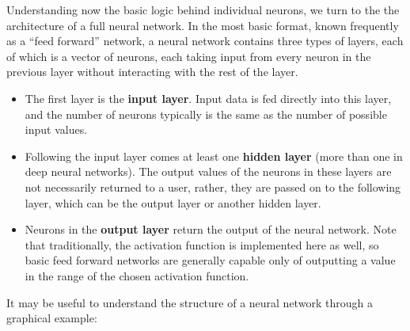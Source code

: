 \documentclass{article}
\begin{document}
Understanding now the basic logic behind individual neurons, we turn to the the architecture of a full neural network. In the most basic format, known frequently as a ``feed forward'' network, a neural network contains three types of layers, each of which is a vector of neurons, each taking input from every neuron in the previous layer without interacting with the rest of the layer.
\begin{itemize}
\item{The first layer is the \textbf{input layer}. Input data is fed directly into this layer, and the number of neurons typically is the same as the number of possible input values.}
\item{Following the input layer comes at least one \textbf{hidden layer} (more than one in deep neural networks). The output values of the neurons in these layers are not necessarily returned to a user, rather, they are passed on to the following layer, which can be the output layer or another hidden layer.}
\item{Neurons in the \textbf{output layer} return the output of the neural network. Note that traditionally, the activation function is implemented here as well, so basic feed forward networks are generally capable only of outputting a value in the range of the chosen activation function.}
\end{itemize}

It may be useful to understand the structure of a neural network through a graphical example:
\begin{center}
\end{center}
\end{document}

